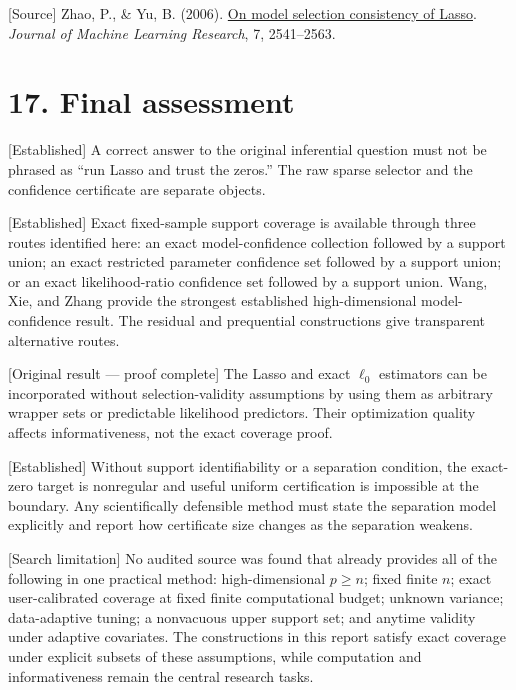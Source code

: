 \documentclass[
  english,
  11pt,
  a4paper,
]{article}
\begin{document}
{[}Source{]} Zhao, P., \& Yu, B. (2006).
\href{https://www.jmlr.org/papers/v7/zhao06a.html}{On model selection
consistency of Lasso}. \emph{Journal of Machine Learning Research}, 7,
2541--2563.

\section{17. Final assessment}\label{final-assessment}

{[}Established{]} A correct answer to the original inferential question
must not be phrased as ``run Lasso and trust the zeros.'' The raw sparse
selector and the confidence certificate are separate objects.

{[}Established{]} Exact fixed-sample support coverage is available
through three routes identified here: an exact model-confidence
collection followed by a support union; an exact restricted parameter
confidence set followed by a support union; or an exact likelihood-ratio
confidence set followed by a support union. Wang, Xie, and Zhang provide
the strongest established high-dimensional model-confidence result. The
residual and prequential constructions give transparent alternative
routes.

{[}Original result --- proof complete{]} The Lasso and exact $\ell_0$
estimators can be incorporated without selection-validity assumptions by
using them as arbitrary wrapper sets or predictable likelihood
predictors. Their optimization quality affects informativeness, not the
exact coverage proof.

{[}Established{]} Without support identifiability or a separation
condition, the exact-zero target is nonregular and useful uniform
certification is impossible at the boundary. Any scientifically
defensible method must state the separation model explicitly and report
how certificate size changes as the separation weakens.

{[}Search limitation{]} No audited source was found that already
provides all of the following in one practical method: high-dimensional
$p\ge n$; fixed finite $n$; exact user-calibrated coverage at fixed
finite computational budget; unknown variance; data-adaptive tuning; a
nonvacuous upper support set; and anytime validity under adaptive
covariates. The constructions in this report satisfy exact coverage
under explicit subsets of these assumptions, while computation and
informativeness remain the central research tasks.
\end{document}
